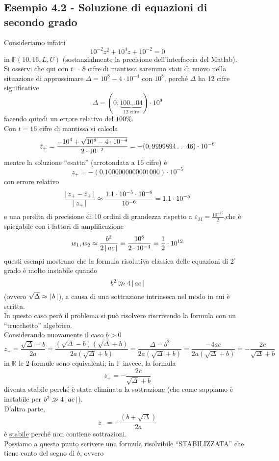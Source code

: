 \subsection{Esempio 4.2 - Soluzione di equazioni di secondo grado}
Consideriamo infatti 
\[10^{-2}z^2 + 10^4z + 10^{-2} = 0\]
in $\mathbb{F}(10,16,L,U)$ (sostanzialmente la precisione dell'interfaccia del Matlab).\\
Si osservi che qui con $t=8$ cifre di mantissa saremmo stati di nuovo nella situazione di approssimare $\Delta = 10^8 - 4 \cdot 10^{-4}$ con $10^8$, perché $\Delta$ ha 12 cifre significative 
\[\Delta = (0,\underbrace{100 \dotsc 04}_{\text{12 cifre}}) \cdot 10^9\]
facendo quindi un errore relativo del $100\%$.\\
Con $t=16$ cifre di mantissa si calcola
\[\Tilde{z}_+ = \frac{-10^4 + \sqrt{10^8 - 4 \cdot 10^{-4}}}{2 \cdot 10^{-2}} = -(0,9999894 \dotsc 46) \cdot 10^{-6}\]
mentre la soluzione “esatta” (arrotondata a 16 cifre) è \[z_+ = -(0.1000000000001000)\cdot 10^{-5}\] con errore relativo
\[\frac{\lvert\,z_+ - \Tilde{z}_+\,\rvert}{\lvert\,z_+\,\rvert} \approx \frac{1.1 \cdot 10^{-5} \cdot 10^{-6}}{10^{-6}} = 1.1 \cdot 10^{-5}\]
e una perdita di precisione di 10 ordini di grandezza rispetto a $\varepsilon_M = \frac{10^{-15}}{2}$,che è spiegabile con i fattori di amplificazione
\[w_1,w_2 \approx \frac{b^2}{2\,\lvert\,ac\,\rvert} = \frac{10^8}{2 \cdot 10^{-4}} = \frac{1}{2} \cdot 10^{12}\]
questi esempi mostrano che la formula risolutiva classica delle equazioni di $2^\circ$ grado è molto instabile quando \[b^2 \gg 4\,\lvert\,ac\,\rvert\] 
(ovvero $\sqrt{\Delta} \approx \lvert\,b\,\rvert$), a causa di una sottrazione intrinseca nel modo in cui è scritta.\\
In questo caso però il problema si può risolvere riscrivendo la formula con un “trucchetto” algebrico. \\
Considerando nuovamente il caso $b>0$ 
\[z_+ = \frac{\sqrt{\Delta}-b}{2a} = \frac{(\sqrt{\Delta}-b)(\sqrt{\Delta}+b)}{2a(\sqrt{\Delta}+b)} = \frac{\Delta -b^2}{2a(\sqrt{\Delta}+b)} = \frac{-4ac}{2a(\sqrt{\Delta}+b)} = - \frac{2c}{\sqrt{\Delta}+b}\] 
in $\mathbb{R}$ le 2 formule sono equivalenti; in $\mathbb{F}$ invece, la formula 
\[z_+ = - \frac{2c}{\sqrt{\Delta}+b}\]
diventa stabile perché è stata eliminata la sottrazione (che come sappiamo è instabile per $b^2 \gg 4\,\lvert\,ac\,\rvert$). \\
D'altra parte, 
\[z_- = - \frac{(b+\sqrt{\Delta})}{2a}\]
è \uline{stabile} perché non contiene sottrazioni.\\
Possiamo a questo punto scrivere una formula risolvibile “STABILIZZATA” che tiene conto del segno di $b$, ovvero
